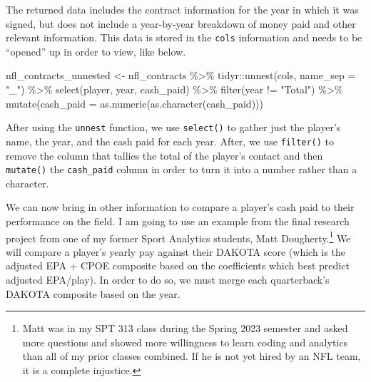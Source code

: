\documentclass[
  letterpaper,
]{krantz}
\newenvironment{Shaded}{\begin{snugshade}}{\end{snugshade}}
\newcommand{\AttributeTok}[1]{\textcolor[rgb]{0.40,0.45,0.13}{#1}}
\newcommand{\FunctionTok}[1]{\textcolor[rgb]{0.28,0.35,0.67}{#1}}
\newcommand{\NormalTok}[1]{\textcolor[rgb]{0.00,0.23,0.31}{#1}}
\newcommand{\OtherTok}[1]{\textcolor[rgb]{0.00,0.23,0.31}{#1}}
\newcommand{\SpecialCharTok}[1]{\textcolor[rgb]{0.37,0.37,0.37}{#1}}
\newcommand{\StringTok}[1]{\textcolor[rgb]{0.13,0.47,0.30}{#1}}
\begin{document}
The returned data includes the contract information for the year in
which it was signed, but does not include a year-by-year breakdown of
money paid and other relevant information. This data is stored in the
\texttt{cols} information and needs to be ``opened'' up in order to
view, like below.

\begin{Shaded}
\begin{Highlighting}[]
\NormalTok{nfl\_contracts\_unnested }\OtherTok{\textless{}{-}}\NormalTok{ nfl\_contracts }\SpecialCharTok{\%\textgreater{}\%}
\NormalTok{  tidyr}\SpecialCharTok{::}\FunctionTok{unnest}\NormalTok{(cols, }\AttributeTok{name\_sep =} \StringTok{"\_"}\NormalTok{) }\SpecialCharTok{\%\textgreater{}\%}
  \FunctionTok{select}\NormalTok{(player, year, cash\_paid) }\SpecialCharTok{\%\textgreater{}\%}
  \FunctionTok{filter}\NormalTok{(year }\SpecialCharTok{!=} \StringTok{"Total"}\NormalTok{) }\SpecialCharTok{\%\textgreater{}\%}
  \FunctionTok{mutate}\NormalTok{(}\AttributeTok{cash\_paid =} \FunctionTok{as.numeric}\NormalTok{(}\FunctionTok{as.character}\NormalTok{(cash\_paid)))}
\end{Highlighting}
\end{Shaded}

After using the \texttt{unnest} function, we use \texttt{select()} to
gather just the player's name, the year, and the cash paid for each
year. After, we use \texttt{filter()} to remove the column that tallies
the total of the player's contact and then \texttt{mutate()} the
\texttt{cash\_paid} column in order to turn it into a number rather than
a character.

We can now bring in other information to compare a player's cash paid to
their performance on the field. I am going to use an example from the
final research project from one of my former Sport Analytics students,
Matt Dougherty.\footnote{Matt was in my SPT 313 class during the Spring
  2023 semester and asked more questions and showed more willingness to
  learn coding and analytics than all of my prior classes combined. If
  he is not yet hired by an NFL team, it is a complete injustice.} We
will compare a player's yearly pay against their DAKOTA score (which is
the adjusted EPA + CPOE composite based on the coefficients which best
predict adjusted EPA/play). In order to do so, we must merge each
quarterback's DAKOTA composite based on the year.
\end{document}
